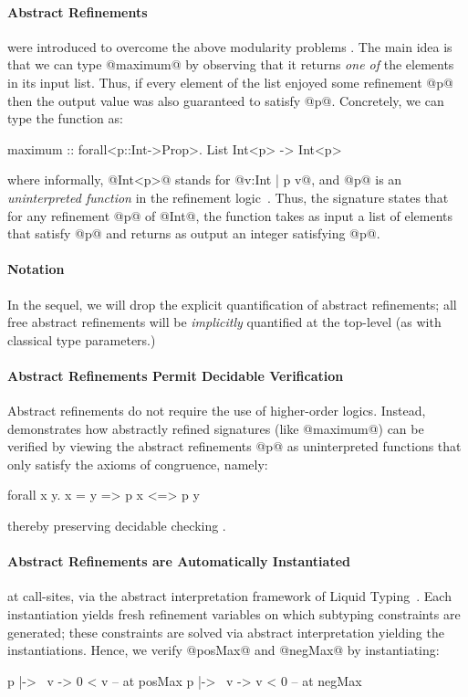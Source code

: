 \paragraph{Abstract Refinements} were introduced to 
overcome the above modularity problems \cite{vazou13}.
%
The main idea is that we can type @maximum@ by observing
that it returns \emph{one of} the elements in its input list.
Thus, if every element of the list enjoyed some refinement @p@
then the output value was also guaranteed to satisfy @p@.
%
Concretely, we can type the function as:
%
\begin{code}
maximum :: forall<p::Int->Prop>. List Int<p> -> Int<p>
\end{code}
%
where informally, @Int<p>@ stands for @{v:Int | p v}@,
and @p@ is an \emph{uninterpreted function} in the refinement 
logic~\cite{NelsonOppen}.
% 
Thus, the signature states that for any refinement @p@ of @Int@,
the function takes as input a list of elements that satisfy @p@ 
and returns as output an integer satisfying @p@. 

\paragraph{Notation} In the sequel, we will drop the explicit
quantification of abstract refinements; all free abstract 
refinements will be \emph{implicitly} quantified at the 
top-level (as with classical type parameters.)

\paragraph{Abstract Refinements Permit Decidable Verification}
Abstract refinements do not require the use of higher-order 
logics. Instead, \cite{vazou13} demonstrates how  abstractly 
refined signatures (like @maximum@) can be verified by viewing 
the abstract refinements @p@ as uninterpreted functions that 
only satisfy the axioms of congruence, namely:
%
\begin{code}
    forall x y. x = y => p x <=> p y
\end{code}
%
thereby preserving decidable checking \cite{NelsonOppen}.

\paragraph{Abstract Refinements are Automatically Instantiated} at call-sites,
via the abstract interpretation framework of Liquid Typing~\cite{vazou13}. 
Each instantiation yields fresh refinement variables on
which subtyping constraints are generated; these constraints
are solved via abstract interpretation yielding the instantiations.
%
Hence, we verify @posMax@ and @negMax@ by instantiating:
%
\begin{code}
    p |-> \ v -> 0 < v   -- at posMax
    p |-> \ v -> v < 0   -- at negMax
\end{code}

